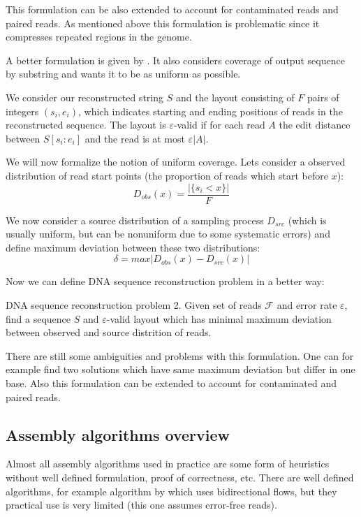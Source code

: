 This formulation can be also extended to account for contaminated reads and paired reads.
As mentioned above this formulation is problematic since it compresses repeated regions
in the genome.

A better formulation is given by \cite{myers1995toward}. It also considers
coverage of output sequence by substring and wants it to be as uniform as possible.

We consider our reconstructed string $S$ and the layout consisting of
$F$ pairs of integers $(s_i, e_i)$, which indicates starting and ending positions
of reads in the reconstructed sequence. The layout is $\varepsilon$-valid
if for each read $A$ the edit distance between $S[s_i:e_i]$ and the read
is at most $\varepsilon |A|$.

We will now formalize the notion of uniform coverage. Lets consider a observed
distribution of read start points (the proportion of reads which start before $x$):
$$D_{obs}(x) = \frac{|\{s_i < x\}|}{F}$$

We now consider a source distribution of a sampling process $D_{src}$ (which is usually
uniform, but can be nonuniform due to some systematic errors) and define maximum
deviation between these two distributions:
$$\delta = max |D_{obs}(x) - D_{src}(x)|$$

Now we can define DNA sequence reconstruction problem in a better way:

\begin{definition}{DNA sequence reconstruction problem 2.}
Given set of reads $\mathcal{F}$ and error rate $\varepsilon$, find
a sequence $S$ and $\varepsilon$-valid layout which has minimal
maximum deviation between observed and source distrition of reads.
\end{definition}

There are still some ambiguities and problems with this formulation.
One can for example find two solutions which have same maximum deviation
but differ in one base.
Also this formulation can be extended to account for contaminated and paired
reads.

\subsection{Assembly algorithms overview}

Almost all assembly algorithms used in practice are some form of heuristics
without well defined formulation, proof of correctness, etc.
There are well defined algorithms, for example algorithm by \cite{Medvedev2009}
which uses bidirectional flows, but they practical use is very limited (this one
assumes error-free reads).

